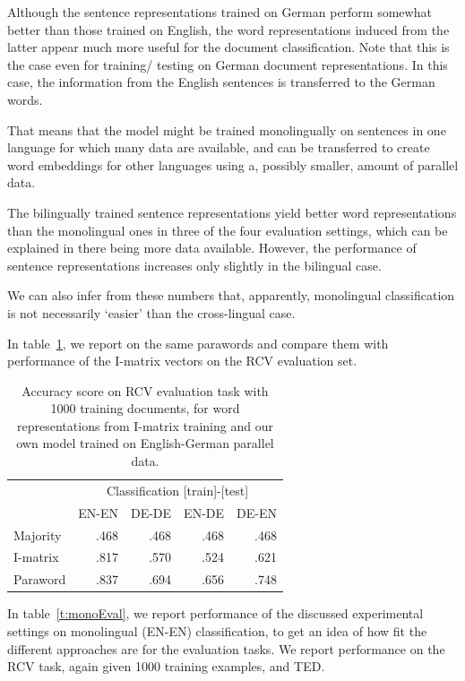Although the sentence representations trained on German perform somewhat better than those trained on English, the word representations induced from the latter appear much more useful for the document classification. Note that this is the case even for training/ testing on German document representations. In this case, the information from the English sentences is transferred to the German words. 

That means that the model might be trained monolingually on sentences in one language for which many data are available, and can be transferred to create word embeddings for other languages using a, possibly smaller, amount of parallel data.

The bilingually trained sentence representations yield better word representations than the monolingual ones in three of the four evaluation settings, which can be explained in there being more data available. However, the performance of sentence representations increases only slightly in the bilingual case.

We can also infer from these numbers that, apparently, monolingual classification is not necessarily `easier' than the cross-lingual case.

In table~\ref{t:dbow_bi_klemen}, we report on the same parawords and compare them with performance of the I-matrix vectors on the RCV evaluation set. 



\begin{table}[ht]
\center
\setlength\tabcolsep{2pt}
\begin{tabular}{l | r r r r}
		& \multicolumn{4}{c}{Classification [train]-[test]}	\\
		&EN-EN	&DE-DE	&EN-DE	&DE-EN	\\\hline
Majority	&.468		&.468		&.468		&.468		\\
I-matrix	&.817		&.570		&.524		&.621		\\
Paraword  	&.837		&.694		&.656		&.748		\\
\end{tabular}
\caption{Accuracy score on RCV evaluation task with 1000 training documents, for word representations from I-matrix training and our own model trained on English-German parallel data.}
\label{t:dbow_bi_klemen}
\end{table}

In table~\ref{t:monoEval}, we report performance of the discussed experimental settings on monolingual (EN-EN) classification, to get an idea of how fit the different approaches are for the evaluation tasks. We report performance on the RCV task, again given 1000 training examples, and TED.


